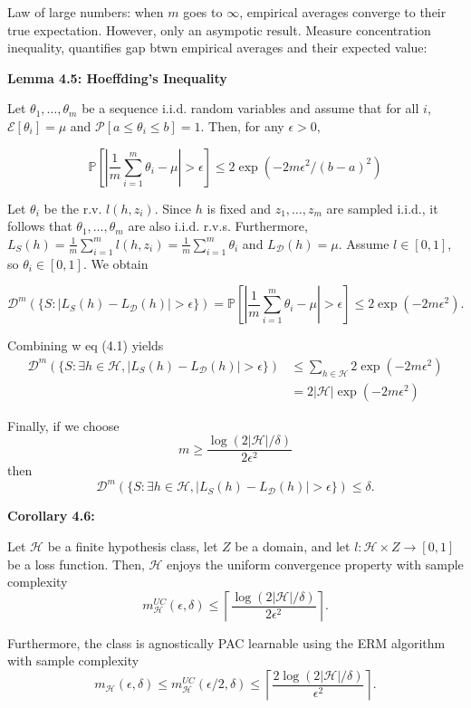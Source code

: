 Law of large numbers: when $m$ goes to $\infty$, empirical averages converge to their true expectation. However, only an asympotic result. Measure concentration inequality, quantifies gap btwn empirical averages and their expected value:

\textbf{Lemma 4.5: Hoeffding's Inequality}

Let $\theta_1, \dots, \theta_m$ be a sequence i.i.d. random variables and assume that for all $i$, $\mathcal{E}[\theta_i] = \mu$ and $\mathcal{P}[a \leq \theta_i \leq b] = 1$. Then, for any $\epsilon > 0$, 

$$\mathbb{P}[|\frac{1}{m} \sum_{i = 1}^m \theta_i - \mu| > \epsilon] \leq 2 \exp(-2m\epsilon^2 / (b-a)^2)$$

\medskip

Let $\theta_i$ be the r.v. $l(h, z_i)$. Since $h$ is fixed and $z_1, \dots, z_m$ are sampled i.i.d., it follows that $\theta_1, \dots, \theta_m$ are also i.i.d. r.v.s. Furthermore, $L_S(h) = \frac{1}{m} \sum_{i=1}^m l(h, z_i) = \frac{1}{m} \sum_{i=1}^m \theta_i$ and $L_{\mathcal{D}}(h) = \mu$. Assume $l \in [0, 1]$, so $\theta_i \in [0, 1]$. We obtain

$$\mathcal{D}^m(\{S :| L_S(h) - L_{\mathcal{D}}(h)| > \epsilon \}) = \mathbb{P}[|\frac{1}{m} \sum_{i=1}^m \theta_i - \mu | > \epsilon] \leq 2 \exp (-2m\epsilon^2).$$

Combining w eq (4.1) yields
\begin{align*}
\mathcal{D}^m(\{S:\exists h \in \mathcal{H}, |L_S(h) - L_{\mathcal{D}}(h)| > \epsilon\}) 
&\leq \sum_{h \in \mathcal{H}} 2 \exp(-2m\epsilon^2) \\
&= 2|\mathcal{H}| \exp(-2m\epsilon^2)
\end{align*}

Finally, if we choose
$$m \geq \frac{\log(2 |\mathcal{H}|/ \delta)}{2\epsilon^2}$$
then
$$\mathcal{D}^m(\{S: \exists h \in \mathcal{H}, |L_S(h) - L_{\mathcal{D}}(h) | > \epsilon \}) \leq \delta.$$

\textbf{Corollary 4.6:}

Let $\mathcal{H}$ be a finite hypothesis class, let $Z$ be a domain, and let $l : \mathcal{H} \times Z \rightarrow [0, 1]$ be a loss function. Then, $\mathcal{H}$ enjoys the uniform convergence property with sample complexity 
$$m_{\mathcal{H}}^{UC}(\epsilon, \delta) \leq \left\lceil \frac{\log(2 |\mathcal{H}|/\delta)}{2 \epsilon^2} \right\rceil.$$

Furthermore, the class is agnostically PAC learnable using the ERM algorithm with sample complexity
$$m_{\mathcal{H}}(\epsilon, \delta) \leq m_{\mathcal{H}}^{UC}(\epsilon/2, \delta) \leq \left\lceil \frac{2 \log(2 |\mathcal{H}|/\delta)}{\epsilon^2} \right\rceil.$$

